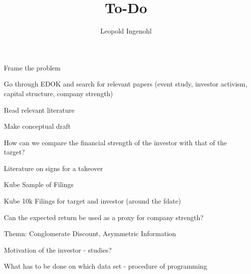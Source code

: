 \documentclass{article}
\title{To-Do}
\author{Leopold Ingenohl}
\newcommand{\cmark}{\ding{51}}%
\newcommand{\done}{\rlap{$\square$}{\raisebox{2pt}{\large\hspace{1pt}\cmark}}%
\hspace{-2.5pt}}
\begin{document}
\maketitle


  \begin{todolist}
  \item[\done] Frame the problem
  \end{todolist}

\begin{todolist}

  \item [\done] Go through EDOK and search for relevant papers (event study, investor activism, capital structure, company strength)
  \item Read relevant literature
  \item Make conceptual draft 
  \item How can we compare the financial strength of the investor with that of the target?
  \item Literature on signs for a takeover
  \item Kube Sample of Filings
  \item Kube 10k Filings for target and investor (around the fdate)
  \item Can the expected return be used as a proxy for company strength? 
  \item Themn: Conglomerate Discount, Asymmetric Information
  \item Motivation of the investor - studies?
  \item What has to be done on which data set - procedure of programming 



\end{todolist}
\end{document}
